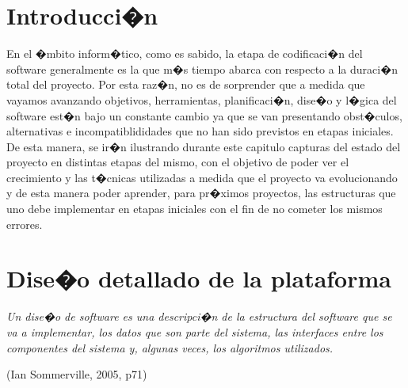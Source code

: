 \section{Introducci�n}
\label{cap3:sec:Introduccion}

	\par En el �mbito inform�tico, como es sabido, la etapa de codificaci�n del software generalmente es la que m�s tiempo abarca con respecto a la duraci�n total del proyecto. Por esta raz�n, no es de sorprender que a medida que vayamos avanzando  objetivos, herramientas, planificaci�n, dise�o y l�gica del software est�n bajo un constante cambio ya que se van presentando obst�culos, alternativas e incompatiblididades que no han sido previstos en etapas iniciales. De esta manera, se ir�n ilustrando durante este capitulo capturas del estado del proyecto en distintas etapas del mismo, con el objetivo de poder ver el crecimiento y las t�cnicas utilizadas a medida que el proyecto va evolucionando y de esta manera poder aprender, para pr�ximos proyectos, las estructuras que uno debe implementar en etapas iniciales con el fin de no cometer los mismos errores.

\section{Dise�o detallado de la plataforma}
\label{cap3:sec:Disenio_detallado}

\begin{center}
	\begin{minipage}{0.9\linewidth}
		\vspace{5pt}%
		{\small
			\textit{Un dise�o de software es una descripci�n de la estructura del software que se va a implementar, los datos que son parte del sistema, las interfaces entre los componentes del sistema y, algunas veces, los algoritmos utilizados.}
		}
		\begin{flushleft}
			(Ian Sommerville, 2005, p71)
		\end{flushleft}
		\vspace{5pt}%
	\end{minipage}
\end{center}


